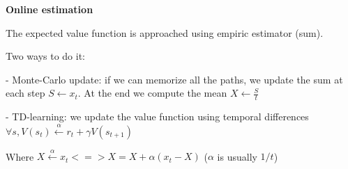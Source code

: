 {\fontsize{12pt}{22pt} \textbf{Online estimation}\par}

\vspace{5mm}

The expected value function is approached using empiric estimator (sum).

Two ways to do it:

- Monte-Carlo update: if we can memorize all the paths, we update the sum at each step $S \leftarrow x_t$. At the end we compute the mean $X \leftarrow \frac{S}{t}$

- TD-learning: we update the value function using temporal differences $\forall s, V(s_t) \xleftarrow{\alpha} r_t + \gamma V(s_{t+1})$

Where $X \xleftarrow{\alpha} x_t <=> X = X + \alpha (x_t - X)$ ($\alpha$ is usually $1/t$)

\vspace{5mm}